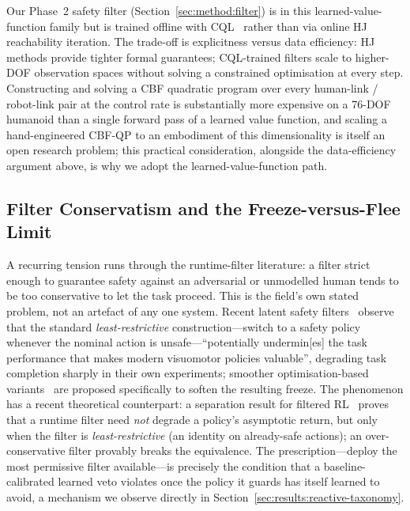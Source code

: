 \documentclass[11pt,a4paper]{report}
\begin{document}
Our Phase~2 safety filter (Section~\ref{sec:method:filter}) is in
this learned-value-function family but is trained offline with
\textsc{CQL}~\cite{kumar2020cql} rather than via online HJ
reachability iteration. The trade-off is explicitness versus
data efficiency: HJ methods provide tighter formal guarantees;
\textsc{CQL}-trained filters scale to higher-DOF observation spaces
without solving a constrained optimisation at every step.
Constructing and solving a CBF quadratic program over every
human-link / robot-link pair at the control rate is substantially
more expensive on a 76-DOF humanoid than a single forward pass of a
learned value function, and scaling a hand-engineered CBF-QP to an
embodiment of this dimensionality is itself an open research
problem; this practical consideration, alongside the data-efficiency
argument above, is why we adopt the learned-value-function path.

\subsection{Filter Conservatism and the Freeze-versus-Flee Limit}
\label{sec:bg:cbf:conservatism}

A recurring tension runs through the runtime-filter literature: a
filter strict enough to guarantee safety against an adversarial or
unmodelled human tends to be too conservative to let the task proceed.
This is the field's own stated problem, not an artefact of any one
system. Recent latent safety filters~\cite{nakamura2025latent} observe
that the standard \emph{least-restrictive} construction---switch to a
safety policy whenever the nominal action is unsafe---``potentially
undermin[es] the task performance that makes modern visuomotor policies
valuable'', degrading task completion sharply in their own experiments;
smoother optimisation-based variants~\cite{latentcbf2025} are proposed
specifically to soften the resulting freeze. The phenomenon has a recent
theoretical counterpart: a separation result for filtered
RL~\cite{permissivefilter2025} proves that a runtime filter need
\emph{not} degrade a policy's asymptotic return, but only when the
filter is \emph{least-restrictive} (an identity on already-safe
actions); an over-conservative filter provably breaks the equivalence.
The prescription---deploy the most permissive filter available---is
precisely the condition that a baseline-calibrated learned veto violates
once the policy it guards has itself learned to avoid, a mechanism we
observe directly in Section~\ref{sec:results:reactive-taxonomy}.
\end{document}

